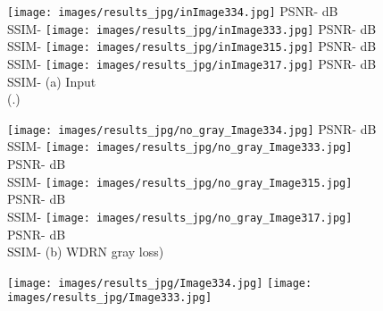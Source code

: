 \documentclass[runningheads]{llncs}
\begin{document}
\begin{figure}
\centering
\newcommand\x{0.23}
\newcommand\scale{0.078}
  \begin{minipage}{\x\linewidth}
		\begin{center}
		\texttt{[image: images/results\_jpg/inImage334.jpg]}
		\fontsize{8}{12pt}\selectfont PSNR- dB \\SSIM-
		\vskip 2pt
        \texttt{[image: images/results\_jpg/inImage333.jpg]}
		\fontsize{8}{12pt}\selectfont PSNR- dB \\SSIM-
		\vskip 2pt
		\texttt{[image: images/results\_jpg/inImage315.jpg]}
		\fontsize{8}{12pt}\selectfont PSNR- dB \\SSIM-
		\vskip 2pt
		\vskip 2pt
		\texttt{[image: images/results\_jpg/inImage317.jpg]}
		\fontsize{8}{12pt}\selectfont PSNR- dB \\SSIM-
		\vskip 2pt
        \fontsize{9}{12pt}\selectfont (a) Input \\ {\color{white} (.)}
		\end{center}
  \end{minipage}
\begin{minipage}{\x\linewidth}
	\begin{center}
	\texttt{[image: images/results\_jpg/no\_gray\_Image334.jpg]}
	\fontsize{8}{12pt}\selectfont PSNR- dB \\SSIM-
	\vskip 2pt
	\texttt{[image: images/results\_jpg/no\_gray\_Image333.jpg]}
	\fontsize{8}{12pt}\selectfont PSNR- dB \\SSIM-
	\vskip 2pt
	\texttt{[image: images/results\_jpg/no\_gray\_Image315.jpg]}
	\fontsize{8}{12pt}\selectfont PSNR- dB \\SSIM-
	\vskip 2pt
    \vskip 2pt
    \texttt{[image: images/results\_jpg/no\_gray\_Image317.jpg]}
    \fontsize{8}{12pt}\selectfont PSNR- dB \\SSIM-
    \vskip 2pt
	\fontsize{9}{12pt}\selectfont (b) WDRN \with gray loss)
		\end{center}
  \end{minipage}
  \begin{minipage}{\x\linewidth}
		\begin{center}
		\texttt{[image: images/results\_jpg/Image334.jpg]}
		\fontsize{8}{12pt}
		\vskip 2pt
		\texttt{[image: images/results\_jpg/Image333.jpg]}
		\fontsize{8}{12pt}

\end{center}
\end{minipage}
\end{figure}
\end{document}
